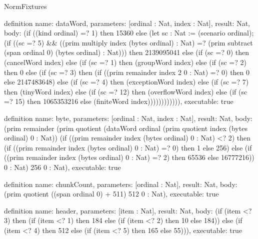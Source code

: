 \begin{lexlean}{NormFixtures}
\begin{semanticmodule}
definition{
  name: dataWord,
  parameters: [ordinal : Nat, index : Nat],
  result: Nat,
  body: (if ((kind ordinal) =? 1) then 15360 else (let sc : Nat := (scenario ordinal); (if ((sc =? 5) && ((prim multiply index (bytes ordinal) : Nat) =? (prim subtract (span ordinal 0) (bytes ordinal) : Nat))) then 2139095041 else (if (sc =? 0) then (cancelWord index) else (if (sc =? 1) then (groupWord index) else (if (sc =? 2) then 0 else (if (sc =? 3) then (if ((prim remainder index 2 0 : Nat) =? 0) then 0 else 2147483648) else (if (sc =? 4) then (exceptionWord index) else (if (sc =? 7) then (tinyWord index) else (if (sc =? 12) then (overflowWord index) else (if (sc =? 15) then 1065353216 else (finiteWord index)))))))))))),
  executable: true
}

definition{
  name: byte,
  parameters: [ordinal : Nat, index : Nat],
  result: Nat,
  body: (prim remainder (prim quotient (dataWord ordinal (prim quotient index (bytes ordinal) 0 : Nat)) (if ((prim remainder index (bytes ordinal) 0 : Nat) <? 2) then (if ((prim remainder index (bytes ordinal) 0 : Nat) =? 0) then 1 else 256) else (if ((prim remainder index (bytes ordinal) 0 : Nat) =? 2) then 65536 else 16777216)) 0 : Nat) 256 0 : Nat),
  executable: true
}

definition{
  name: chunkCount,
  parameters: [ordinal : Nat],
  result: Nat,
  body: (prim quotient ((span ordinal 0) + 511) 512 0 : Nat),
  executable: true
}

definition{
  name: header,
  parameters: [item : Nat],
  result: Nat,
  body: (if (item <? 3) then (if (item <? 1) then 184 else (if (item <? 2) then 10 else 184)) else (if (item <? 4) then 512 else (if (item <? 5) then 165 else 55))),
  executable: true
}


\end{semanticmodule}
\end{lexlean}
